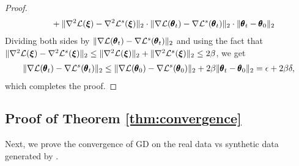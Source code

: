 \begin{proof}
\begin{align}
& \quad\quad + \|\nabla^2{\mathcal{L}} (\boldsymbol{\xi}) -  \nabla^2 {\mathcal{L}}^s (\boldsymbol{\xi})\|_2 \cdot \|\nabla{\mathcal{L}} (\pmb{\theta}_t) -  \nabla {\mathcal{L}}^s (\pmb{\theta}_t)\|_2 \cdot  \|\pmb{\theta}_t- \pmb{\theta}_0\|_2\nonumber
\end{align}
Dividing both sides by $\|\nabla{\mathcal{L}} (\pmb{\theta}_t) -  \nabla {\mathcal{L}}^s (\pmb{\theta}_t) \|_2$ and using the fact that $\|\nabla^2{\mathcal{L}} (\boldsymbol{\xi}) -  \nabla^2 {\mathcal{L}}^s (\boldsymbol{\xi})\|_2\leq \|\nabla^2{\mathcal{L}} (\boldsymbol{\xi})\|_2 + \|  \nabla^2 {\mathcal{L}}^s (\boldsymbol{\xi})\|_2 \leq 2\beta$, we get
\begin{align}
\|\nabla{\mathcal{L}} (\pmb{\theta}_t) -  \nabla {\mathcal{L}}^s (\pmb{\theta}_t) \|_2 \leq   \|\nabla{\mathcal{L}} (\pmb{\theta}_0) -  \nabla {\mathcal{L}}^s (\pmb{\theta}_0) \|_2  + 2\beta   \|\pmb{\theta}_t- \pmb{\theta}_0\|_2 = \epsilon +2\beta\delta,\label{eq:g_error}
\end{align}
which completes the proof.
\end{proof}

%
%

%
%
%
%
%
%
%
%
%
%
%
%
%
%
%
%

\subsection{Proof of Theorem \ref{thm:convergence}}
Next, we prove the convergence of GD on the real data vs synthetic data generated by \alg.

